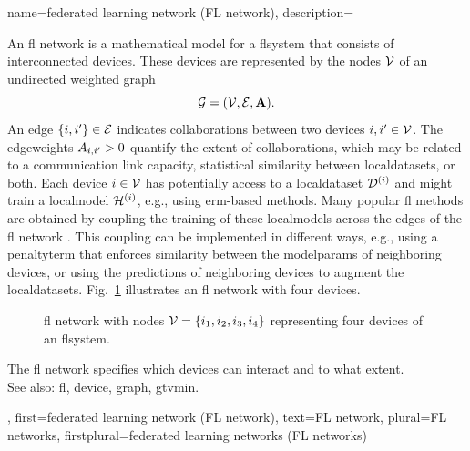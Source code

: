 {name={federated learning network (FL network)},
	description={An \gls{fl} network is a 
		mathematical model for a \gls{flsystem} that consists of interconnected 
		\glspl{device}. These \glspl{device} are represented by the nodes $\mathcal{V}$ 
		of an undirected weighted \gls{graph}
		\[
			\mathcal{G} = (\mathcal{V},\mathcal{E},{\bf A}).
		\]
		An edge $\{i,i'\} \in \mathcal{E}$ indicates collaborations 
		between two \glspl{device} $i, i' \in \mathcal{V}$. 
		The \glspl{edgeweight} $A_{i,i'} > 0$ 
		quantify the extent of collaborations, which may be related to a 
		communication link capacity, statistical similarity between 
		\glspl{localdataset}, or both. Each \gls{device} $i \in \mathcal{V}$ 
		has potentially access to a \gls{localdataset} $\mathcal{D}^{(i)}$ and 
		might train a \gls{localmodel} $\mathcal{H}^{(i)}$, e.g., using 
		\gls{erm}-based methods. Many popular \gls{fl} methods are obtained by 
		coupling the \gls{training} of these \glspl{localmodel} across the edges of the 
		\gls{fl} network \cite{JungFLBook}. This coupling can be implemented in different ways, 
		e.g., using a \gls{penaltyterm} that enforces similarity between the \glspl{modelparam} 
		of neighboring \glspl{device}, or using the \glspl{prediction} of neighboring 
		\glspl{device} to augment the \glspl{localdataset}.
		Fig.\ \ref{fig_fl_network_dict} illustrates an \gls{fl} network with four \glspl{device}.
		\begin{figure}[H]
		\centering
		\caption{\Gls{fl} network with nodes $\mathcal{V}=\{i_1,i_2,i_3,i_4\}$ 
			representing four \glspl{device} of an \gls{flsystem}. \label{fig_fl_network_dict}}
		\end{figure}
		The \gls{fl} network specifies which \glspl{device} can interact and to what extent. 
	    	\\
		See also: \gls{fl}, \gls{device}, \gls{graph}, \gls{gtvmin}.},
	first={federated learning network (FL network)},
	text={FL network},
	plural={FL networks}, 
	firstplural={federated learning networks (FL networks)}
}

